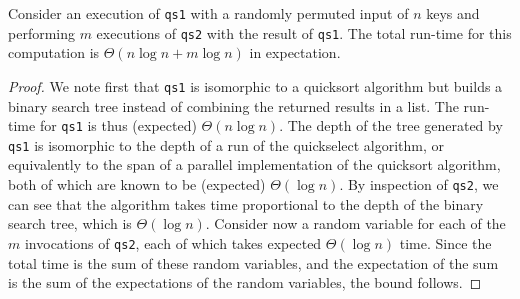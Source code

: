 \begin{abstrsyn}
\begin{theorem}
  Consider an execution of \texttt{qs1} with a randomly permuted input
  of $n$ keys and performing $m$ executions of \texttt{qs2} with the
  result of \texttt{qs1}.  The total run-time for this computation is
  $\Theta(n\log{n} + m\log{n})$ in expectation.
\end{theorem}
\begin{proof}
  We note first that \texttt{qs1} is
  isomorphic to a quicksort algorithm but builds a binary search tree
  instead of combining the returned results in a list.  The run-time
  for \texttt{qs1} is thus (expected) $\Theta(n\log{n})$.
%
  The depth of the tree generated by \texttt{qs1} is isomorphic to the
    depth of a run of the quickselect algorithm, or equivalently to the
    span of a parallel implementation of the quicksort algorithm, both
    of which are known to be (expected) $\Theta(\log{n})$.
%
    By inspection of \texttt{qs2}, we can see that the algorithm takes
    time proportional to the depth of the binary search tree, which is
    $\Theta(\log{n})$. Consider now a random variable for each of the
    $m$ invocations of \texttt{qs2}, each of which takes expected
    $\Theta(\log{n})$ time.  Since the total time is the sum of these
    random variables, and the expectation of the sum is the sum of
    the expectations of the random variables, the bound follows.
\end{proof}

\end{abstrsyn}
